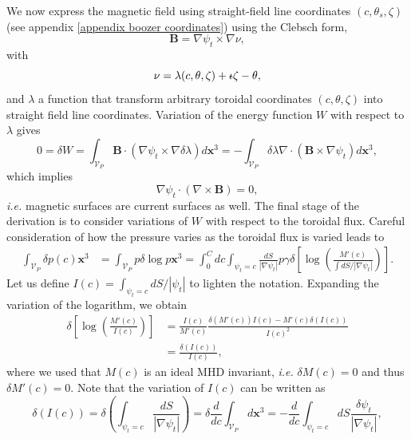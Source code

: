 \documentclass[my_thesis.tex]{subfiles}
\begin{document}
We now express the magnetic field using straight-field line coordinates $(c,\theta_s,\zeta)$ (see appendix \ref{appendix boozer coordinates}) using the Clebsch form,
\begin{equation}
	\mathbf{B} = \nabla\psi_t\times\nabla\nu,
\end{equation}
with
\begin{equation}
	\nu = \lambda(c,\theta,\zeta) + \text{$\iota\!\!$-}\zeta - \theta,
\end{equation}
and $\lambda$ a function that transform arbitrary toroidal coordinates $(c,\theta,\zeta)$ into straight field line coordinates. Variation of the energy function $W$ with respect to $\lambda$ gives
\begin{equation}
	0=\delta W = \int_{\mathcal{V}_P}\mathbf{B}\cdot(\nabla\psi_t\times\nabla\delta\lambda)d\mathbf{x}^3=-\int_{\mathcal{V}_P} \delta\lambda\nabla\cdot(\mathbf{B}\times\nabla\psi_t)d\mathbf{x}^3,
\end{equation}
which implies
\begin{equation}
	\nabla\psi_t\cdot(\nabla\times\mathbf{B})=0,
\end{equation}
\textit{i.e.} magnetic surfaces are current surfaces as well. The final stage of the derivation is to consider variations of $W$ with respect to the toroidal flux. Careful consideration of how the pressure varies as the toroidal flux is varied leads to
\begin{align}
	\int_{\mathcal{V}_P} \delta p(c) \mathbf{x}^3 &= \int_{\mathcal{V}_P}p  \delta \log p\mathbf{x}^3 = \int_0^C dc \int_{\psi_t=c} \frac{dS}{|\nabla\psi_t|} p \gamma \delta\left[\log \left(\frac{M'(c)}{\int dS/|\nabla\psi_t|}\right)\right].
\end{align}
Let us define $I(c)=\int_{\psi_t=c}dS/|\psi_t|$ to lighten the notation. Expanding the variation of the logarithm, we obtain
\begin{align}
	\delta\left[\log\left(\frac{M'(c)}{I(c)}\right)\right] &= \frac{I(c)}{M'(c)} \frac{\delta(M'(c))I(c) - M'(c)\delta(I(c))}{I(c)^2} \\
	&= \frac{\delta(I(c))}{I(c)},
\end{align}
where we used that $M(c)$ is an ideal MHD invariant, \textit{i.e.} $\delta M(c)=0$ and thus $\delta M'(c)=0$. Note that the variation of $I(c)$ can be written as
\begin{equation}
	\delta(I(c)) = \delta\left(\int_{\psi_t=c}\frac{dS}{|\nabla\psi_t|}\right) = \delta \frac{d}{dc}\int_{\mathcal{V}_P}d\mathbf{x}^3 = -\frac{d}{dc}\int_{\psi_t=c}dS\frac{\delta\psi_t}{|\nabla\psi_t|},
\end{equation}
\end{document}
